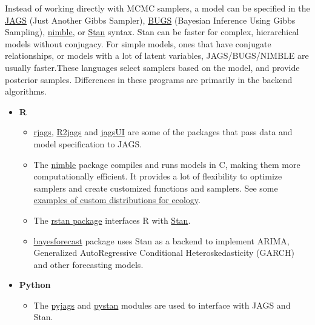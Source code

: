 \documentclass[
]{book}
\providecommand{\tightlist}{%
  \setlength{\itemsep}{0pt}\setlength{\parskip}{0pt}}
\begin{document}
Instead of working directly with MCMC samplers, a model can be specified in the \href{https://mcmc-jags.sourceforge.io/}{JAGS} (Just Another Gibbs Sampler), \href{https://www.mrc-bsu.cam.ac.uk/software/bugs/}{BUGS} (Bayesian Inference Using Gibbs Sampling), \href{https://cran.r-project.org/web/packages/nimble/index.html}{nimble}, or \href{https://mc-stan.org/}{Stan} syntax. Stan can be faster for complex, hierarchical models without conjugacy. For simple models, ones that have conjugate relationships, or models with a lot of latent variables, JAGS/BUGS/NIMBLE are usually faster.These languages select samplers based on the model, and provide posterior samples. Differences in these programs are primarily in the backend algorithms.

\begin{itemize}
\tightlist
\item
  \textbf{R}

  \begin{itemize}
  \tightlist
  \item
    \href{https://cran.r-project.org/web/packages/rjags/index.html}{rjags}, \href{http://R2jags}{R2jags} and \href{https://cran.r-project.org/web/packages/jagsUI/index.html}{jagsUI} are some of the packages that pass data and model specification to JAGS.
  \item
    The \href{https://cran.r-project.org/web/packages/nimble/index.html}{nimble} package compiles and runs models in C, making them more computationally efficient. It provides a lot of flexibility to optimize samplers and create customized functions and samplers. See some \href{https://r-nimble.org/nimbleecology-custom-nimble-distributions-for-ecologists}{examples of custom distributions for ecology}.
  \item
    The \href{https://mc-stan.org/rstan/}{rstan package} interfaces R with \href{https://mc-stan.org/users/documentation/}{Stan}.
  \item
    \href{https://CRAN.R-project.org/package=bayesforecast}{bayesforecast} package uses Stan as a backend to implement ARIMA, Generalized AutoRegressive Conditional Heteroskedasticity (GARCH) and other forecasting models.
  \end{itemize}
\item
  \textbf{Python}

  \begin{itemize}
  \tightlist
  \item
    The \href{https://pypi.org/project/pyjags/}{pyjags} and \href{https://pypi.org/project/pystan/2.2.0.0/}{pystan} modules are used to interface with JAGS and Stan.
  \end{itemize}
\end{itemize}
\end{document}

